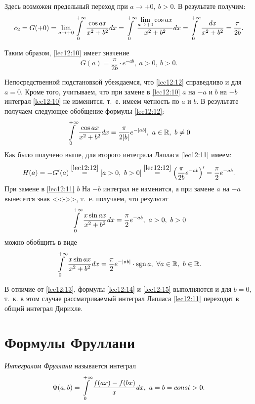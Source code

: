 \documentclass[../../main.tex]{subfiles}
\begin{document}
Здесь возможен предельный переход при $a \to +0,\ b > 0$. В результате получим:
\[c_2 = G(+0) = \lim_{a\to+0} \int\limits_{0}^{+\infty} \frac{\cos ax}{x^2 + b^2}dx = \int\limits_{0}^{+\infty} 
\frac{\lim\limits_{a\to+0} \cos ax}{x^2 + b^2}dx = \int\limits_{0}^{+\infty} \frac{dx}{x^2 + b^2} 
= \frac{\pi}{2b}.\]

Таким образом, \eqref{lec12:10} имеет значение
\begin{equation}
G(a) = \frac\pi{2b}\cdot e^{-ab},\ a > 0,\ b > 0.
\label{lec12:12}
\end{equation}

Непосредственной подстановкой убеждаемся, что \eqref{lec12:12} справедливо и 
для $a=0$. Кроме того, учитываем, что при замене в \eqref{lec12:10} $a$ на 
$-a$ и $b$ на $-b$ интеграл \eqref{lec12:10} не изменится, т.~е. имеем 
четность по $a$ и $b$. В результате получаем следующее обобщение формулы 
\eqref{lec12:12}:
\begin{equation}
\int\limits_{0}^{+\infty} \frac{\cos ax}{x^2 + b^2}dx = \frac{\pi}{2|b|} e^{-|ab|},\ a \in \mathbb{R},\ b 
\ne 0
\label{lec12:13}
\end{equation}
Как было получено выше, для второго интеграла Лапласа \eqref{lec12:11} имеем:
\[H(a) = -G'(a) \stk{lec12:12}= [a > 0,\ b > 0] \stk{lec12:12}= 
\left(\frac\pi{2b} e^{-ab}\right)' = \frac\pi2 e^{-ab}.\]
При замене в \eqref{lec12:11} $b$ На $-b$ интеграл не изменится, а при замене 
$a$ на $-a$ вынесется знак <<->>, т.~е. получаем, что результат
\begin{equation}
\int\limits_{0}^{+\infty} \frac{x\sin ax}{x^2 + b^2} dx = \frac{\pi}2 e^{-ab},\ a > 0,\ b > 0
\label{lec12:14}
\end{equation}
можно обобщить в виде
\begin{equation}
\ioinf \frac{x\sin ax}{x^2 + b^2} dx = \frac\pi2 e^{-|ab|}\cdot\sgn a,\ 
\forall a \in \R,\ b \in \R.
\label{lec12:15}
\end{equation}

В отличие от \eqref{lec12:13}, формулы \eqref{lec12:14} и \eqref{lec12:15} 
выполняются и для $b = 0$, т.~к. в этом случае рассматриваемый интеграл 
Лапласа \eqref{lec12:11} переходит в общий интеграл Дирихле. 

\section{Формулы Фруллани}

\emph{Интегралом Фруллани} называется интеграл
\begin{equation}
\Phi(a, b) = \ioinf \frac{f(ax) - f(bx)}{x} dx,\ a = b = const > 0.
\label{lec12:16}
\end{equation}
\end{document}
